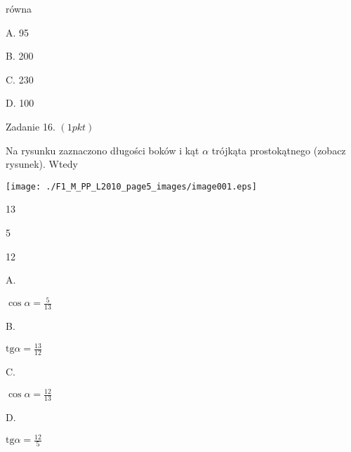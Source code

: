 \documentclass[a4paper,12pt]{article}
\begin{document}
równa

A. 95

B. 200

C. 230

D. 100

Zadanie 16. $(1pkt)$

Na rysunku zaznaczono długości boków i kąt $\alpha$ trójkąta prostokątnego (zobacz rysunek). Wtedy
\begin{center}
\texttt{[image: ./F1\_M\_PP\_L2010\_page5\_images/image001.eps]}
\end{center}
13

5

12

A.

$\displaystyle \cos\alpha=\frac{5}{13}$

B.

$\displaystyle \mathrm{t}\mathrm{g}\alpha=\frac{13}{12}$

C.

$\displaystyle \cos\alpha=\frac{12}{13}$

D.

$\displaystyle \mathrm{t}\mathrm{g}\alpha=\frac{12}{5}$
\end{document}
